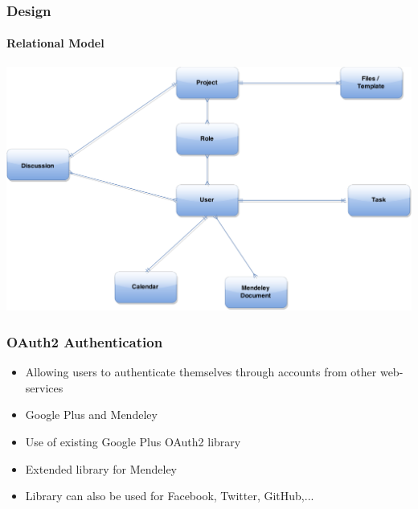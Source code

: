\documentclass{beamer}
\begin{document}
\begin{frame}
\frametitle{Design}\framesubtitle{Relational Model}
\centering
\includegraphics[scale=0.15]{./images/RMA.png}
\end{frame}
\begin{frame}\frametitle{OAuth2 Authentication}
	\begin{itemize}
		\item Allowing users to authenticate themselves through accounts from other web-services
		\item Google Plus and Mendeley
		\item Use of existing Google Plus OAuth2 library
		\item Extended library for Mendeley
		\item Library can also be used for Facebook, Twitter, GitHub,...
	\end{itemize}
\end{frame}
\end{document}
